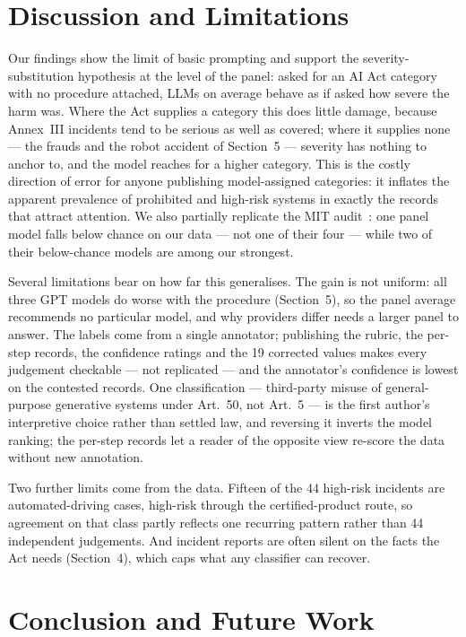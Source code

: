 \documentclass[sigconf,natbib=false, language=english]{acmart}
\begin{document}
\section{Discussion and Limitations}
\label{sec:disc}

Our findings show the limit of basic prompting and support the severity-substitution
hypothesis at the level of the panel: asked for an AI Act category with no procedure
attached, LLMs on average behave as if asked how severe the harm was. Where the Act
supplies a category this does little
damage, because Annex~III incidents tend to be serious as well as covered; where it
supplies none --- the frauds and the robot accident of Section~5 --- severity has
nothing to anchor to, and the model reaches for a higher category. This is the costly direction of error for
anyone publishing model-assigned categories: it inflates the apparent prevalence of
prohibited and high-risk systems in exactly the records that attract attention. We also partially replicate the MIT
audit~\cite{mit_tracker_2026}: one panel model falls below chance on our data --- not
one of their four --- while two of their below-chance models are among our strongest.

Several limitations bear on how far this generalises. The gain is not uniform: all
three GPT models do worse with the procedure (Section~5), so the panel average
recommends no particular model, and why providers differ needs a larger panel to
answer. The labels come from a single
annotator; publishing the rubric, the per-step records, the confidence ratings and the
19 corrected values makes every judgement checkable --- not replicated --- and the
annotator's confidence is lowest on the contested records. One classification ---
third-party misuse of general-purpose generative systems under Art.~50, not Art.~5 ---
is the first author's interpretive choice rather than settled law, and reversing it
inverts the model ranking; the per-step records let a reader of the opposite view
re-score the data without new annotation.

Two further limits come from the data. Fifteen of the 44 high-risk incidents are
automated-driving cases, high-risk through the certified-product route, so agreement
on that class partly reflects one recurring pattern rather than 44 independent
judgements. And incident reports are often silent on the facts the Act needs
(Section~4), which caps what any classifier can recover.

\section{Conclusion and Future Work}
\end{document}
